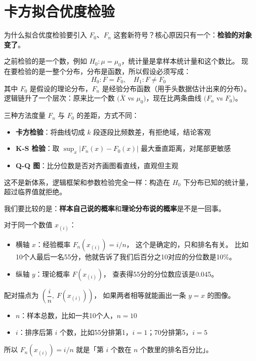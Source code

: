 \section{卡方拟合优度检验}
\begin{note}
为什么拟合优度检验要引入 $F_0$、$F_n$ 这套新符号？核心原因只有一个：\textbf{检验的对象变了}。

之前检验的是一个数，例如 $H_0: \mu = \mu_0$，统计量是拿样本统计量和这个数比。
现在要检验的是一整个分布，分布是函数，所以假设必须写成：
\[
H_0: F = F_0, \quad H_1: F \neq F_0
\]
其中 $F_0$ 是假设的理论分布，$F_n$ 是经验分布函数（用手头数据估计出来的分布）。
逻辑链升了一个层次：原来比一个数 $(\bar{X}$ vs $\mu_0)$，现在比两条曲线 $(F_n$ vs $F_0)$。

三种方法度量 $F_n$ 与 $F_0$ 的差距，方式不同：
\begin{itemize}
  \item \textbf{卡方检验}：将曲线切成 $k$ 段逐段比频数差，有拒绝域，结论客观
  \item \textbf{K-S 检验}：取 $\sup_x|F_n(x)-F_0(x)|$ 最大垂直距离，对尾部更敏感
  \item \textbf{Q-Q 图}：比分位数是否对齐画图看直线，直观但主观
\end{itemize}

这不是新体系，逻辑框架和参数检验完全一样：构造在 $H_0$ 下分布已知的统计量，超过临界值就拒绝。
\end{note}
\begin{dxtips}[P-P图的直觉理解]

我们要比较的是：\textbf{样本自己说的概率}和\textbf{理论分布说的概率}是不是一回事。

对于同一个数值 $x_{(i)}$：
\begin{itemize}
    \item 横轴 $x$：经验概率 $F_n(x_{(i)}) = i/n$，
    这个是确定的，只和排名有关。
    比如10个人最后一名55分，他就告诉了我们后百分之10对应的分位数是10\%。
    
    \item 纵轴 $y$：理论概率 $F(x_{(i)})$，
    查表得55分的分位数应该是0.045。
\end{itemize}

配对描点为 $\left(\dfrac{i}{n},\ F(x_{(i)})\right)$，
如果两者相等就能画出一条 $y = x$ 的图像。

\end{dxtips}
\begin{note}[$F_n(x_{(i)}) = i/n$ 的含义]

\begin{itemize}
    \item $n$：样本总数，比如一共10个人，$n = 10$
    \item $i$：排序后第 $i$ 个数，比如55分排第1，$i = 1$；70分排第5，$i = 5$
\end{itemize}

所以 $F_n(x_{(i)}) = i/n$ 就是「第 $i$ 个数在 $n$ 个数里的排名百分比」。

\end{note}

